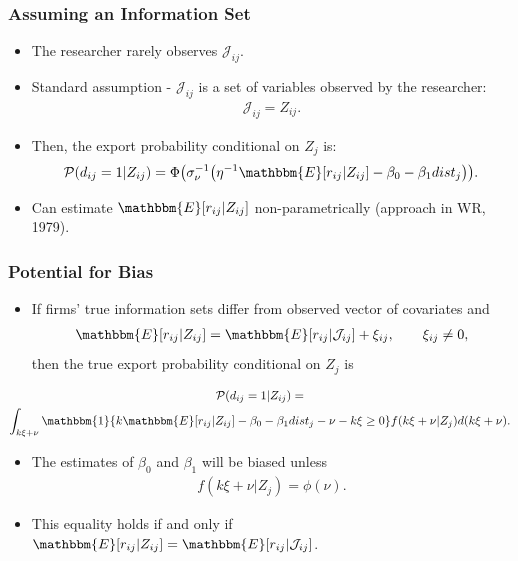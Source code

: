 \documentclass[10pt,letterpaper]{beamer}
\begin{document}
\begin{frame}
\frametitle{Assuming an Information Set}

\begin{itemize}
	\item The researcher rarely observes $\mathcal{J}_{ij}$.
	\item Standard assumption - $\mathcal{J}_{ij}$ is a set of variables observed by the researcher:
	\begin{align*}
	\mathcal{J}_{ij}=Z_{ij}.
	\end{align*}
	\item Then, the export probability conditional on $Z_{j}$ is:
	\begin{align*}
	\mathcal{P}(d_{ij}=1|Z_{ij})=\Phi\big(\sigma_{\nu}^{-1}\big(\eta^{-1}\mathbbm{E}[r_{ij}|Z_{ij}]-\beta_{0}-\beta_{1}dist_{j}\big)\big).
	\end{align*}
	\item Can estimate $\mathbbm{E}[r_{ij}|Z_{ij}]$ non-parametrically (approach in WR, 1979).
\end{itemize}
\end{frame}
\begin{frame}[label=info_sets]
\frametitle{Potential for Bias}

\begin{itemize}
	\item If firms' true information sets differ from observed vector of covariates and
	\begin{align*}
	\mathbbm{E}[r_{ij}|Z_{ij}]=\mathbbm{E}[r_{ij}|\mathcal{J}_{ij}]+\xi_{ij},\qquad\xi_{ij}\neq0,
	\end{align*}
	then the true export probability conditional on $Z_{j}$ is 
\end{itemize}	
	\begin{gather*}
	\mathcal{P}(d_{ij}=1|Z_{ij})=\\
	\int_{k\xi+\nu}\mathbbm{1}\{k\mathbbm{E}[r_{ij}|Z_{ij}]-\beta_{0}-\beta_{1}dist_{j}-\nu-k\xi\geq 0\}f(k\xi+\nu|Z_{j})d(k\xi+\nu).
	\end{gather*}
\begin{itemize}
	\item The estimates of $\beta_{0}$ and $\beta_{1}$ will be biased unless 
	\begin{align*}
	f(k\xi+\nu|Z_{j})=\phi(\nu).
	\end{align*}
	\item This equality holds if and only if $\mathbbm{E}[r_{ij}|Z_{ij}]=\mathbbm{E}[r_{ij}|\mathcal{J}_{ij}]$.
\end{itemize}
\end{frame}
\end{document}
